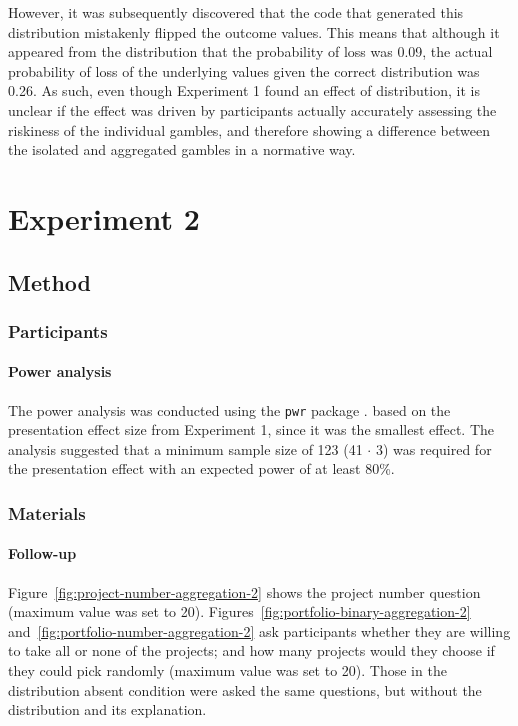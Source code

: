 \documentclass[a4paper, nobind, dvipsnames]{templates/ociamthesis}
\theoremstyle{definition}
\theoremstyle{definition}
\theoremstyle{definition}
\theoremstyle{definition}
\theoremstyle{remark}
\begin{document}
However, it was subsequently discovered that the code that generated this
distribution mistakenly flipped the outcome values. This means that although it
appeared from the distribution that the probability of loss was
0.09, the actual probability of loss of the
underlying values given the correct distribution was
0.26. As such, even though Experiment 1
found an effect of distribution, it is unclear if the effect was driven by
participants actually accurately assessing the riskiness of the individual
gambles, and therefore showing a difference between the isolated and aggregated
gambles in a normative way.

\section{Experiment 2}

\subsection{Method}

\subsubsection{Participants}

\hypertarget{power-analysis-aggregation-2}{%
\paragraph{Power analysis}\label{power-analysis-aggregation-2}}

The power analysis was conducted using the \texttt{pwr} package \autocite{champely2020}. based
on the presentation effect size from Experiment 1, since it was the smallest
effect. The analysis suggested that a minimum sample size of
123 (41 \(\cdot\) 3) was required for
the presentation effect with an expected power of at least 80\%.

\subsubsection{Materials}

\hypertarget{follow-up-materials-aggregation-2-appendix}{%
\paragraph{Follow-up}\label{follow-up-materials-aggregation-2-appendix}}

Figure~\ref{fig:project-number-aggregation-2} shows the project number
question (maximum value was set to 20).
Figures~\ref{fig:portfolio-binary-aggregation-2}
and~\ref{fig:portfolio-number-aggregation-2} ask participants whether they are
willing to take all or none of the projects; and how many projects would they
choose if they could pick randomly (maximum value was set to 20). Those in the
distribution absent condition were asked the same questions, but without the
distribution and its explanation.
\end{document}
